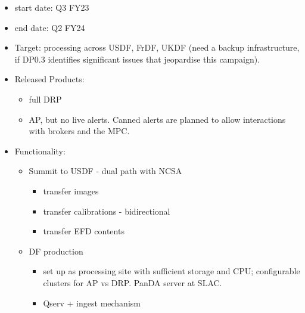 \begin{itemize}

\item start date: Q3 \gls{FY23}

\item end date: Q2 \gls{FY24}

\item Target: processing across USDF, FrDF, UKDF (need a backup infrastructure, if DP0.3 identifies significant issues that jeopardise this campaign).

\item Released Products:

  \begin{itemize}

  \item full \gls{DRP}

  \item \gls{AP}, but no live alerts. Canned alerts are planned to allow interactions with brokers and the \gls{MPC}.

  \end{itemize}

\item Functionality:
  
  \begin{itemize}

  \item \gls{Summit} to \gls{USDF}  - dual path with NCSA

    \begin{itemize}

    \item transfer images

    \item transfer calibrations - bidirectional

    \item transfer \gls{EFD} contents

    \end{itemize}

  \item \gls{DF} production

    \begin{itemize}

    \item set up as processing site with sufficient storage and \gls{CPU}; configurable clusters for AP vs DRP. PanDA server at \gls{SLAC}.
      
    \item \gls{Qserv} + ingest mechanism
      

\end{itemize}
\end{itemize}
\end{itemize}
